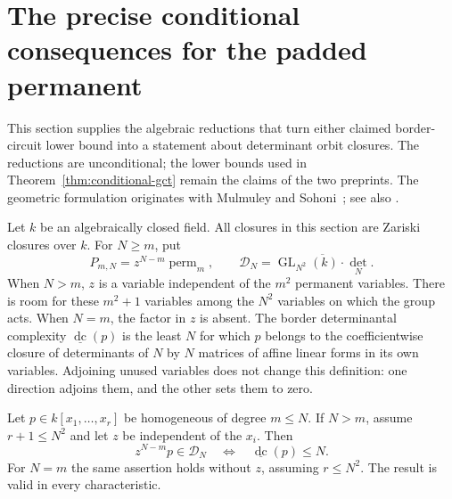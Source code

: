 \section{The precise conditional consequences for the padded permanent}
\label{sec:gct}

This section supplies the algebraic reductions that turn either claimed
border-circuit lower bound into a statement about determinant orbit
closures.  The reductions are unconditional; the lower bounds used in
Theorem~\ref{thm:conditional-gct} remain the claims of the two preprints.
The geometric formulation originates with Mulmuley and
Sohoni~\cite{MulmuleySohoni2001}; see also
\cite[arXiv version~3, Section~1(a), Conjecture~1.2, p.~2]
{BurgisserIkenmeyerPanova2019}.

Let $k$ be an algebraically closed field.  All closures in this section
are Zariski closures over $k$.  For $N\geq m$, put
\[
 P_{m,N}=z^{N-m}\operatorname{perm}_m,
 \qquad
 \mathcal D_N=\overline{\operatorname{GL}_{N^2}(k)\cdot\det_N}.
\]
When $N>m$, $z$ is a variable independent of the $m^2$ permanent
variables.  There is room for these $m^2+1$ variables among the $N^2$
variables on which the group acts.  When $N=m$, the factor in $z$ is
absent.  The border determinantal complexity $\underline{\operatorname{dc}}(p)$
is the least $N$ for which $p$ belongs to the coefficientwise closure of
determinants of $N$ by $N$ matrices of affine linear forms in its own
variables.  Adjoining unused variables does not change this definition:
one direction adjoins them, and the other sets them to zero.

\begin{lemma}\label{lem:padding}
Let $p\in k[x_1,\ldots,x_r]$ be homogeneous of degree $m\leq N$.
If $N>m$, assume $r+1\leq N^2$ and let $z$ be independent of the
$x_i$.  Then
\[
 z^{N-m}p\in\mathcal D_N
 \quad\Longleftrightarrow\quad
 \underline{\operatorname{dc}}(p)\leq N.
\]
For $N=m$ the same assertion holds without $z$, assuming $r\leq N^2$.
The result is valid in every characteristic.
\end{lemma}

